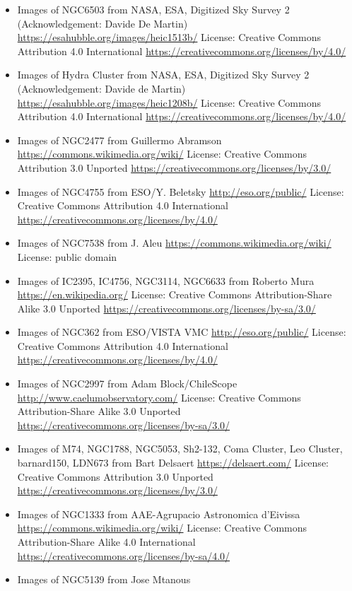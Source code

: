 \begin{itemize}
\item Images of NGC6503
	 from NASA, ESA, Digitized Sky Survey 2 (Acknowledgement: Davide De Martin)
	 \url{https://esahubble.org/images/heic1513b/}
	 License: Creative Commons Attribution 4.0 International \url{https://creativecommons.org/licenses/by/4.0/}
\item Images of Hydra Cluster
	 from NASA, ESA, Digitized Sky Survey 2 (Acknowledgement: Davide de Martin)
	 \url{https://esahubble.org/images/heic1208b/}
	 License: Creative Commons Attribution 4.0 International \url{https://creativecommons.org/licenses/by/4.0/}
\item Images of NGC2477
	 from Guillermo Abramson
	 \url{https://commons.wikimedia.org/wiki/}
	 License: Creative Commons Attribution 3.0 Unported \url{https://creativecommons.org/licenses/by/3.0/}
\item Images of NGC4755
	 from ESO/Y. Beletsky
	 \url{http://eso.org/public/}
	 License: Creative Commons Attribution 4.0 International \url{https://creativecommons.org/licenses/by/4.0/} 
\item Images of NGC7538
	 from J. Aleu
	 \url{https://commons.wikimedia.org/wiki/}
	 License: public domain
\item Images of IC2395, IC4756, NGC3114, NGC6633
	 from Roberto Mura
	 \url{https://en.wikipedia.org/}
	 License: Creative Commons Attribution-Share Alike 3.0 Unported \url{https://creativecommons.org/licenses/by-sa/3.0/}
\item Images of NGC362
	 from ESO/VISTA VMC
	 \url{http://eso.org/public/}
	 License: Creative Commons Attribution 4.0 International \url{https://creativecommons.org/licenses/by/4.0/} 
\item Images of NGC2997
	 from Adam Block/ChileScope
	 \url{http://www.caelumobservatory.com/}
	 License: Creative Commons Attribution-Share Alike 3.0 Unported \url{https://creativecommons.org/licenses/by-sa/3.0/}
\item Images of M74, NGC1788, NGC5053, Sh2-132, Coma Cluster, Leo Cluster, barnard150, LDN673
	 from Bart Delsaert
	 \url{https://delsaert.com/}
	 License: Creative Commons Attribution 3.0 Unported \url{https://creativecommons.org/licenses/by/3.0/}
\item Images of NGC1333
	 from AAE-Agrupacio Astronomica d'Eivissa
	 \url{https://commons.wikimedia.org/wiki/}
	 License: Creative Commons Attribution-Share Alike 4.0 International \url{https://creativecommons.org/licenses/by-sa/4.0/}
\item Images of NGC5139
	 from Jose Mtanous

\end{itemize}
